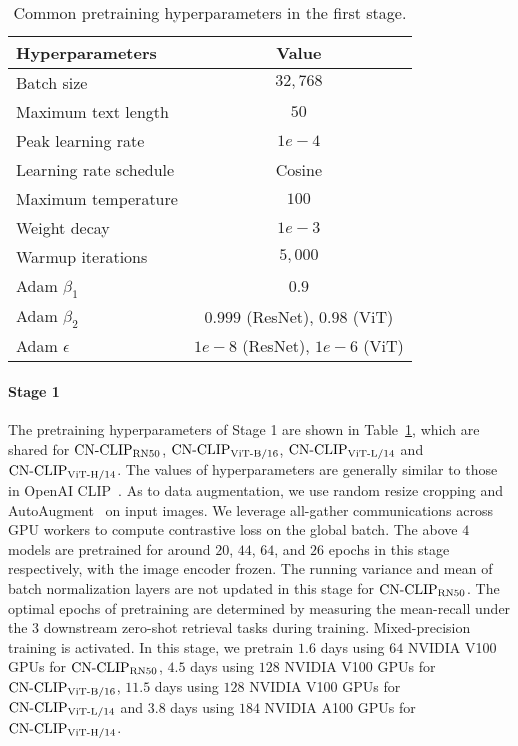 \documentclass[11pt]{article}
\begin{document}
\begin{table}[t]
\center
\small
\begin{tabular}{lc}
\toprule
  Hyperparameters
  & Value
  \\
\midrule
    Batch size
    & $32,768$
    \\
    Maximum text length
    & $50$
    \\             
    Peak learning rate
    & $1e-4$
    \\
    Learning rate schedule
    & Cosine
    \\    
Maximum temperature
    & $100$
    \\
    Weight decay
    & $1e-3$
    \\        
    Warmup iterations
    & $5,000$
    \\        
    Adam $\beta_1$
    & $0.9$
    \\      
    Adam $\beta_2$
    & $0.999$ (ResNet), $0.98$ (ViT)
    \\     
    Adam $\epsilon$
    & $1e-8$ (ResNet), $1e-6$ (ViT)
    \\        
\bottomrule
\end{tabular}
\caption{Common pretraining hyperparameters in the first stage.}
\label{tb:hyperparams_stage1}
\end{table} 
\paragraph{Stage 1} 
The pretraining hyperparameters of Stage 1 are shown in Table~\ref{tb:hyperparams_stage1}, which are shared for $\text{CN-CLIP}\rm_{RN50}$, $\text{CN-CLIP}\rm_{ViT\text{-}B/16}$, $\text{CN-CLIP}\rm_{ViT\text{-}L/14}$ and $\text{CN-CLIP}\rm_{ViT\text{-}H/14}$. 
The values of hyperparameters are generally similar to those in OpenAI CLIP~\citep{clip}. 
As to data augmentation, we use random resize cropping and AutoAugment~\citep{autoaugment} on input images. We leverage all-gather communications across GPU workers to compute contrastive loss on the global batch. The above $4$ models are pretrained for around $20$, $44$, $64$, and $26$ epochs in this stage respectively, with the image encoder frozen. The running variance and mean of batch normalization layers are not updated in this stage for $\text{CN-CLIP}\rm_{RN50}$. The optimal epochs of pretraining are determined by measuring the mean-recall under the $3$ downstream zero-shot retrieval tasks during training. Mixed-precision training is activated. 
In this stage, we pretrain $1.6$ days using $64$ NVIDIA V100 GPUs for $\text{CN-CLIP}\rm_{RN50}$, $4.5$ days using $128$ NVIDIA V100 GPUs for $\text{CN-CLIP}\rm_{ViT\text{-}B/16}$, $11.5$ days using $128$ NVIDIA V100 GPUs for $\text{CN-CLIP}\rm_{ViT\text{-}L/14}$ and $3.8$ days using $184$ NVIDIA A100 GPUs for $\text{CN-CLIP}\rm_{ViT\text{-}H/14}$.
\end{document}
